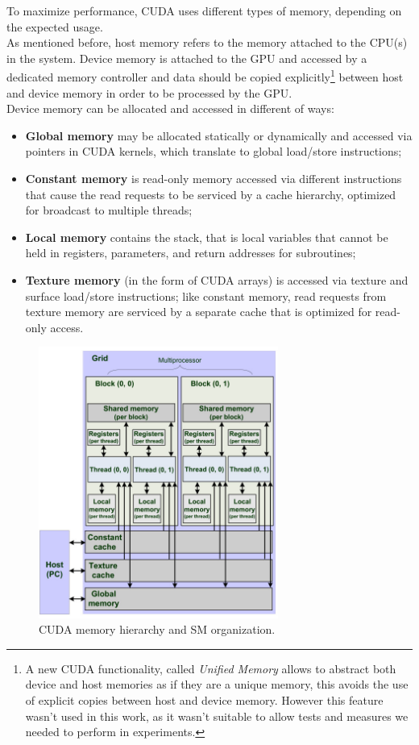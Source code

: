 		
	To maximize performance, CUDA uses different types of memory, depending on the expected usage.\\
	As mentioned before, host memory refers to the memory attached to the CPU(s) in the system. Device memory is attached to the GPU and accessed by a dedicated memory controller and data should be copied explicitly\footnote{A new CUDA functionality, called \textit{Unified Memory} allows to abstract both device and host memories as if they are a unique memory, this avoids the use of explicit copies between host and device memory. However this feature wasn't used in this work, as it wasn't suitable to allow tests and measures we needed to perform in experiments. } between host and device memory in order to be processed by the GPU.\\
	Device memory can be allocated and accessed in different of ways:
	\begin{itemize}
		\item \textbf{Global memory} may be allocated statically or dynamically and accessed via pointers in CUDA kernels, which translate to global load/store instructions;
		\item \textbf{Constant memory} is read-only memory accessed via different instructions that cause the read requests to be serviced by a cache hierarchy, optimized for broadcast to multiple threads;
		\item \textbf{Local memory} contains the stack, that is local variables that cannot be held in registers, parameters, and return addresses for subroutines;
		\item \textbf{Texture memory} (in the form of CUDA arrays) is accessed via texture and surface load/store instructions; like constant memory, read requests from texture memory are serviced by a separate cache that is optimized for read-only access\cite{cudahandbook}.
	\end{itemize}
	\begin{figure}[t]%
		\vspace*{-1cm}
		\centering
		\includegraphics[width=0.7\textwidth]{images/Memory-model-CUDA-memory-hierarchy.jpeg}
		\caption{CUDA memory hierarchy and SM organization.}
		\label{fig:memhierarchy}
	\end{figure}
